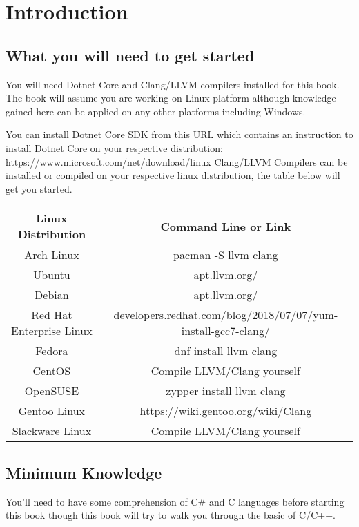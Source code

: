 \chapter{Introduction}
\section{What you will need to get started}
You will need Dotnet Core and Clang/LLVM compilers installed for this book. The book will assume you are working on Linux platform although knowledge gained here can be applied on any other platforms including Windows.

You can install Dotnet Core SDK from this URL which contains an instruction to install Dotnet Core on your respective distribution:
\newline \newline
 https://www.microsoft.com/net/download/linux
\newline \newline
Clang/LLVM Compilers can be installed or compiled on your respective linux distribution, the table below will get you started.
\newline \newline
\begin{tabular}{| c | c |}
	\hline 
	\textbf{Linux Distribution} & \textbf{Command Line or Link} \\
	\hline
	 Arch Linux & pacman -S llvm clang  \\
	 \hline
	 Ubuntu & apt.llvm.org/ \\
	 \hline
	 Debian & apt.llvm.org/ \\
	 \hline
	 Red Hat Enterprise Linux & developers.redhat.com/blog/2018/07/07/yum-install-gcc7-clang/ \\
	 \hline
	 Fedora & dnf install llvm clang \\
	 \hline
	 CentOS & Compile LLVM/Clang yourself  \shrug \\
	 \hline
	 OpenSUSE & zypper install llvm clang \\
	 \hline
	 Gentoo Linux & https://wiki.gentoo.org/wiki/Clang \\
	 \hline
	 Slackware Linux & Compile LLVM/Clang yourself  \shrug \\
	 \hline
\end{tabular}

\section{Minimum Knowledge}
You'll need to have some comprehension of C\# and C languages before starting this book though this book will try to walk you through the basic of C/C++.
